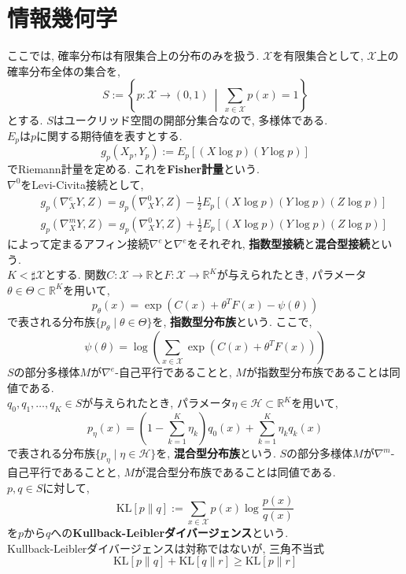 \documentclass{jarticle}
\theoremstyle{definition}
\begin{document}
\section{情報幾何学}
   ここでは, 確率分布は有限集合上の分布のみを扱う. 
   $\mathcal{X}$を有限集合として, 
   $\mathcal{X}$上の確率分布全体の集合を, 
   \[
   		S:=\left\{ p:\mathcal{X}\to (0,1)\ \middle|\  \sum_{x\in\mathcal{X}}p(x)=1  \right\}
   \]
   とする. $S$はユークリッド空間の開部分集合なので, 多様体である.\\
   $E_p$は$p$に関する期待値を表すとする.
   \[
   		g_p(X_p,Y_p):=E_p[(X \log p)(Y \log p)]	
   \]
   でRiemann計量を定める. これを{\bf Fisher計量}という. \\
   $\nabla^0$をLevi-Civita接続として, 
   \begin{eqnarray*}
   		& & g_p(\nabla_X^e Y,Z)=g_p(\nabla_X^0 Y,Z)-\frac{1}{2}E_p[(X \log p)(Y \log p)(Z \log p)]\\
        & & g_p(\nabla_X^m Y,Z)=g_p(\nabla_X^0 Y,Z)+\frac{1}{2}E_p[(X \log p)(Y \log p)(Z \log p)]
   \end{eqnarray*}
   によって定まるアフィン接続$\nabla^e$と$\nabla^e$をそれぞれ, 
   {\bf 指数型接続}と{\bf 混合型接続}という. \\
   $K<\sharp\mathcal{X}$とする. 
   関数$C:\mathcal{X}\to\mathbb{R}$と$F:\mathcal{X}\to\mathbb{R}^K$が与えられたとき, 
   パラメータ$\theta\in\Theta\subset\mathbb{R}^K$を用いて, 
   \[
   		p_\theta(x) = \exp(C(x)+\theta^T F(x)-\psi(\theta))
   \]
   で表される分布族$\{ p_\theta \mid \theta\in\Theta \}$を, 
   {\bf 指数型分布族}という. ここで, 
   \[
   		\psi(\theta)=\log\left( \sum_{x\in\mathcal{X}} \exp(C(x)+\theta^T F(x)) \right)
   \]
   $S$の部分多様体$M$が$\nabla^e$-自己平行であることと, 
   $M$が指数型分布族であることは同値である.\\
   $q_0,q_1,\dots,q_K \in S$が与えられたとき, 
   パラメータ$\eta\in \mathcal{H}\subset\mathbb{R}^K$を用いて, 
   \[
   		p_\eta(x)=\left( 1-\sum_{k=1}^K \eta_k \right)q_0(x) + \sum_{k=1}^K \eta_k q_k(x)
   \]
   で表される分布族$\{ p_\eta \mid \eta\in\mathcal{H} \}$を, 
   {\bf 混合型分布族}という. 
   $S$の部分多様体$M$が$\nabla^m$-自己平行であることと, 
   $M$が混合型分布族であることは同値である.\\
   $p,q\in S$に対して, 
   \[
   		\text{KL}[p\|q]:=\sum_{x\in\mathcal{X}}p(x)\log\frac{p(x)}{q(x)}
   \]
   を$p$から$q$への{\bf Kullback-Leiblerダイバージェンス}という. \\
   Kullback-Leiblerダイバージェンスは対称ではないが, 三角不当式
   \[
   		\text{KL}[p\|q]+\text{KL}[q\|r]\geq\text{KL}[p\|r]
   \]
\end{document}

